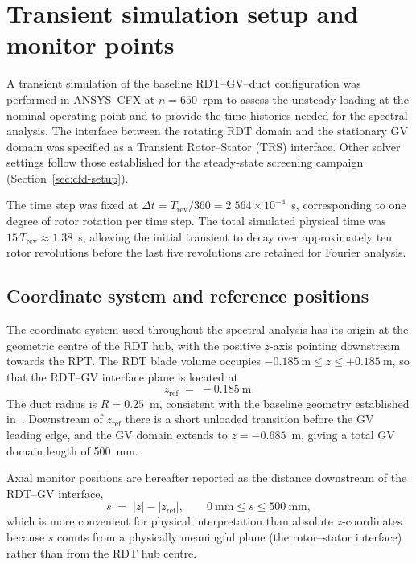 \section{Transient simulation setup and monitor points}
\label{sec:monitor-setup}
 
A transient simulation of the baseline RDT--GV--duct
configuration was performed in ANSYS~CFX at $n = 650$~rpm to assess
the unsteady loading at the nominal operating point and to provide
the time histories needed for the spectral analysis. The interface
between the rotating RDT domain and the stationary GV
domain was specified as a Transient Rotor--Stator (TRS) interface.
Other solver settings follow those established for the steady-state
screening campaign (Section~\ref{sec:cfd-setup}).
 
The time step was fixed at $\Delta t = T_{\mathrm{rev}}/360
= 2.564\times 10^{-4}$~s, corresponding to one degree of rotor
rotation per time step. The total simulated physical time was
$15\,T_{\mathrm{rev}} \approx 1.38$~s, allowing the initial
transient to decay over approximately ten rotor revolutions before
the last five revolutions are retained for Fourier analysis.
 
\subsection{Coordinate system and reference positions}
\label{sec:coord-system}
 
The coordinate system used throughout the spectral analysis has its
origin at the geometric centre of the RDT hub, with the
positive $z$-axis pointing downstream towards the RPT. The
RDT blade volume occupies
$-0.185~\mathrm{m} \leq z \leq +0.185~\mathrm{m}$, so that the
RDT--GV interface plane is located at
\begin{equation}
    z_{\mathrm{ref}} \;=\; -0.185~\mathrm{m}. \label{eq:zref}
\end{equation}
The duct radius is $R = 0.25$~m, consistent with the baseline
geometry established in~\cite{Leonsen2025}. Downstream of
$z_{\mathrm{ref}}$ there is a short unloaded transition before the
GV leading edge, and the GV domain extends to
$z = -0.685$~m, giving a total GV domain length of 500~mm.
 
Axial monitor positions are hereafter reported as the distance
downstream of the RDT--GV interface,
\begin{equation}
    s \;=\; |z| - |z_{\mathrm{ref}}|,
    \qquad 0~\mathrm{mm} \leq s \leq 500~\mathrm{mm},
\end{equation}
which is more convenient for physical interpretation than absolute
$z$-coordinates because $s$ counts from a physically meaningful
plane (the rotor--stator interface) rather than from the RDT
hub centre.
 
